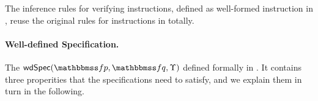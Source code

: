 The inference rules for verifying instructions, 
defined as well-formed instruction in 
\Fig{\ref{fig:Selected Inference Rules for 
Refinement Verification}}, reuse the original rules 
for instructions in 
\Fig{\ref{fig:Seleted Inference rules}} totally.
        

\paragraph{\textbf{Well-defined Specification.}}
The $\wdSpec{\relspecpre}{\relspecpost}{\hprim}$ 
defined  formally in 
\Def{\ref{def:well-defined specification}}.  
It contains three properities that 
the specifications need to satisfy, 
and we explain them in turn in the following. 

